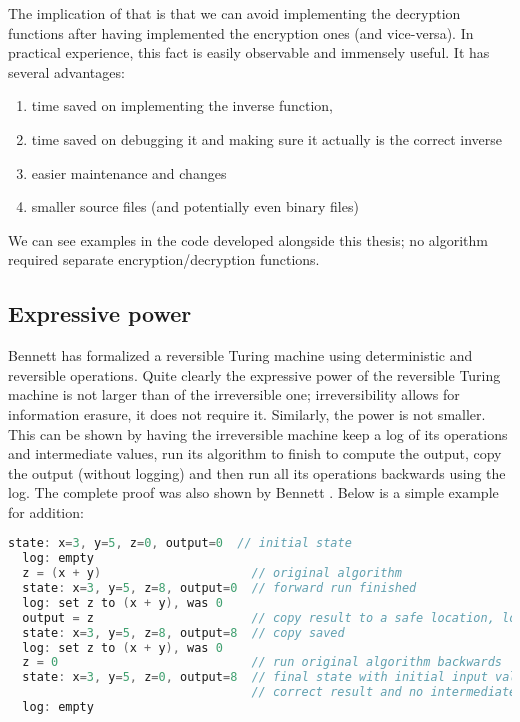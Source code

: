 \documentclass[a4paper,10pt,openright]{memoir}
\begin{document}
The implication of that is that we can avoid implementing the 
decryption functions after having implemented the encryption ones (and 
vice-versa). In practical experience, this fact is easily observable 
and immensely useful. It has several advantages:

\begin{enumerate}
\item time saved on implementing the inverse function,
\item time saved on debugging it and making sure it actually is the correct inverse
\item easier maintenance and changes
\item smaller source files (and potentially even binary files)
\end{enumerate}

We can see examples in the code developed alongside this thesis; no 
algorithm required separate encryption/decryption functions.

\subsection{Expressive power}
\label{sec:expr-power}

Bennett has formalized \cite{Bennett73} a reversible Turing machine 
using deterministic and reversible operations. Quite clearly the 
expressive power of the reversible Turing machine is not larger than of 
the irreversible one; irreversibility allows for information erasure, 
it does not require it. Similarly, the power is not smaller. This can 
be shown by having the irreversible machine keep a log of its 
operations and intermediate values, run its algorithm to finish to 
compute the output, copy the output (without logging) and then run all 
its operations backwards using the log. The complete proof was also 
shown by Bennett \cite{Bennett73}. Below is a simple example for 
addition:

\begin{lstlisting}[language=c]
  state: x=3, y=5, z=0, output=0  // initial state
  log: empty
  z = (x + y)                     // original algorithm
  state: x=3, y=5, z=8, output=0  // forward run finished
  log: set z to (x + y), was 0
  output = z                      // copy result to a safe location, log ignored
  state: x=3, y=5, z=8, output=8  // copy saved
  log: set z to (x + y), was 0
  z = 0                           // run original algorithm backwards
  state: x=3, y=5, z=0, output=8  // final state with initial input values, 
                                  // correct result and no intermediate values
  log: empty
\end{lstlisting}
\end{document}
